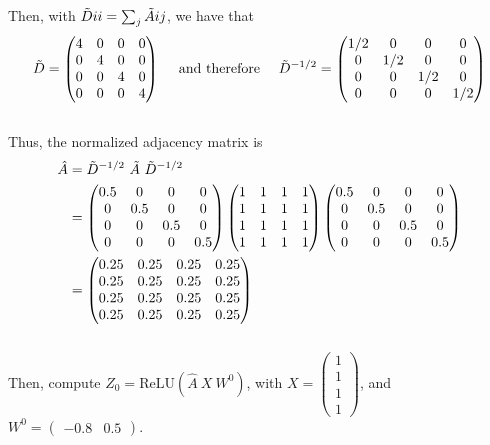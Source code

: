 \documentclass[a4paper]{article}
\begin{document}
Then, with $\Tilde{D}{ii} = \sum_j \Tilde{A}{ij}$, we have that
\[
\Tilde{D} = \begin{pmatrix}
4 & 0 & 0 & 0 \\
0 & 4 & 0 & 0 \\
0 & 0 & 4 & 0 \\
0 & 0 & 0 & 4
\end{pmatrix}\ \ \ \text{ and therefore }\ \ \ \Tilde{D}^{-1/2} = \begin{pmatrix}
1/2 & 0 & 0 & 0 \\
0 & 1/2 & 0 & 0 \\
0 & 0 & 1/2 & 0 \\
0 & 0 & 0 & 1/2 
\end{pmatrix}
\]
\\
Thus, the normalized adjacency matrix is
\begin{align*}
    \hat{A} &= \Tilde{D}^{-1/2}\ \Tilde{A}\ \Tilde{D}^{-1/2}\\
    &= \begin{pmatrix}
0.5 & 0 & 0 & 0 \\
0 & 0.5 & 0 & 0 \\
0 & 0 & 0.5 & 0 \\
0 & 0 & 0 & 0.5
\end{pmatrix} \begin{pmatrix}
1 & 1 & 1 & 1 \\
1 & 1 & 1 & 1 \\
1 & 1 & 1 & 1 \\
1 & 1 & 1 & 1  
\end{pmatrix} \begin{pmatrix}
0.5 & 0 & 0 & 0 \\
0 & 0.5 & 0 & 0 \\
0 & 0 & 0.5 & 0 \\
0 & 0 & 0 & 0.5
\end{pmatrix} \\
&= \begin{pmatrix}
0.25 & 0.25 & 0.25 & 0.25 \\
0.25 & 0.25 & 0.25 & 0.25 \\
0.25 & 0.25 & 0.25 & 0.25 \\
0.25 & 0.25 & 0.25 & 0.25
\end{pmatrix} 
\end{align*}
\\
Then, compute $Z_0 = \text{ReLU} (\hat{A}\ X\ W^0)$, with  $X = \begin{pmatrix}
    1\\1\\1\\1 \end{pmatrix}$, and $W^0 = \begin{pmatrix}
        -0.8 & 0.5
    \end{pmatrix}$.
\end{document}
